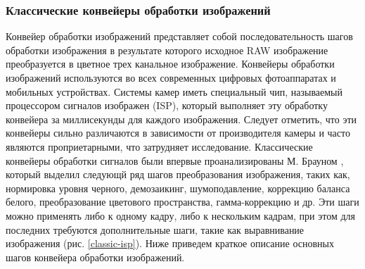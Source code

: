 \subsubsection{Классические конвейеры обработки изображений}\label{sect-1-2-1}

Конвейер обработки изображений представляет собой последовательность шагов обработки изображения в результате которого исходное RAW изображение преобразуется в цветное трех канальное изображение. Конвейеры обработки изображений используются во всех современных цифровых фотоаппаратах и мобильных устройствах. Системы камер
иметь специальный чип, называемый процессором сигналов изображен (ISP), который выполняет эту обработку конвейера за миллисекунды для каждого изображения. Следует отметить, что эти конвейеры сильно различаются в зависимости от производителя камеры и часто являются проприетарными, что затрудняет исследование.  Классические конвейеры обработки сигналов были впервые проанализированы М. Брауном \cite{lib-borwn}, который выделил следующй ряд шагов преобразования изображения, таких как, нормировка уровня черного, демозаикинг, шумоподавление, коррекцию баланса белого, преобразование цветового пространства, гамма-коррекцию и др. Эти шаги можно применять либо к одному кадру, либо к нескольким кадрам, при этом для последних требуются дополнительные шаги, такие как выравнивание изображения (рис. \ref{classic-isp}). Ниже приведем краткое описание основных шагов конвейера обработки изображений.


